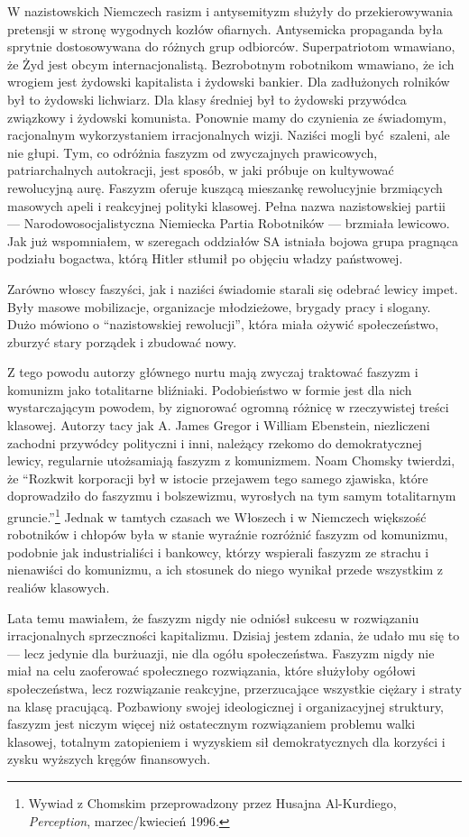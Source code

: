 \documentclass[12pt]{book}
\begin{document}
W nazistowskich Niemczech rasizm i antysemityzm służyły do przekierowywania pretensji w stronę wygodnych kozłów ofiarnych. Antysemicka propaganda była sprytnie dostosowywana do różnych grup odbiorców. Superpatriotom wmawiano, że Żyd jest obcym internacjonalistą. Bezrobotnym robotnikom wmawiano, że ich wrogiem jest żydowski kapitalista i żydowski bankier. Dla zadłużonych rolników był to żydowski lichwiarz. Dla klasy średniej był to żydowski przywódca związkowy i żydowski komunista. Ponownie mamy do czynienia ze świadomym, racjonalnym wykorzystaniem irracjonalnych wizji. Naziści mogli być szaleni, ale nie głupi. Tym, co odróżnia faszyzm od zwyczajnych prawicowych, patriarchalnych autokracji, jest sposób, w jaki próbuje on kultywować rewolucyjną aurę. Faszyzm oferuje kuszącą mieszankę rewolucyjnie brzmiących masowych apeli i reakcyjnej polityki klasowej. Pełna nazwa nazistowskiej partii — Narodowosocjalistyczna Niemiecka Partia Robotników — brzmiała lewicowo. Jak już wspomniałem, w szeregach oddziałów SA istniała bojowa grupa pragnąca podziału bogactwa, którą Hitler stłumił po objęciu władzy państwowej.

Zarówno włoscy faszyści, jak i naziści świadomie starali się odebrać lewicy impet. Były masowe mobilizacje, organizacje młodzieżowe, brygady pracy i slogany. Dużo mówiono o ``nazistowskiej rewolucji'', która miała ożywić społeczeństwo, zburzyć stary porządek i zbudować nowy.

Z tego powodu autorzy głównego nurtu mają zwyczaj traktować faszyzm i komunizm jako totalitarne bliźniaki. Podobieństwo w formie jest dla nich wystarczającym powodem, by zignorować ogromną różnicę w rzeczywistej treści klasowej. Autorzy tacy jak A. James Gregor i William Ebenstein, niezliczeni zachodni przywódcy polityczni i inni, należący rzekomo do demokratycznej lewicy, regularnie utożsamiają faszyzm z komunizmem. Noam Chomsky twierdzi, że ``Rozkwit korporacji był w istocie przejawem tego samego zjawiska, które doprowadziło do faszyzmu i bolszewizmu, wyrosłych na tym samym totalitarnym gruncie.''\footnote{Wywiad z Chomskim przeprowadzony przez Husajna Al-Kurdiego, \textit{Perception}, marzec/kwiecień 1996.} Jednak w tamtych czasach we Włoszech i w Niemczech większość robotników i chłopów była w stanie wyraźnie rozróżnić faszyzm od komunizmu, podobnie jak industrialiści i bankowcy, którzy wspierali faszyzm ze strachu i nienawiści do komunizmu, a ich stosunek do niego wynikał przede wszystkim z realiów klasowych.

Lata temu mawiałem, że faszyzm nigdy nie odniósł sukcesu w rozwiązaniu irracjonalnych sprzeczności kapitalizmu. Dzisiaj jestem zdania, że udało mu się to — lecz jedynie dla burżuazji, nie dla ogółu społeczeństwa. Faszyzm nigdy nie miał na celu zaoferować społecznego rozwiązania, które służyłoby ogółowi społeczeństwa, lecz rozwiązanie reakcyjne, przerzucające wszystkie ciężary i straty na klasę pracującą. Pozbawiony swojej ideologicznej i organizacyjnej struktury, faszyzm jest niczym więcej niż ostatecznym rozwiązaniem problemu walki klasowej, totalnym zatopieniem i wyzyskiem sił demokratycznych dla korzyści i zysku wyższych kręgów finansowych.
\end{document}
